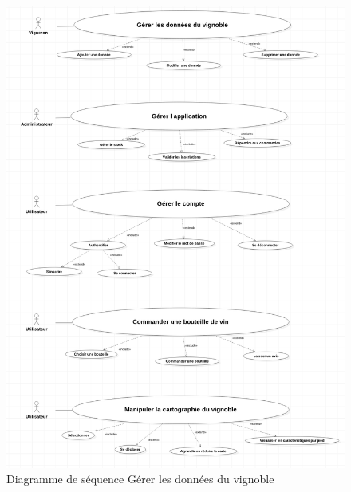 \documentclass[a4paper, title]{report}
\begin{document}
\begin{figure}
\centering
\includegraphics{Images/UseCaseDiagramDetailSolution}
\caption{Diagramme de séquence Gérer les données du vignoble}
\end{figure}
\end{document}
